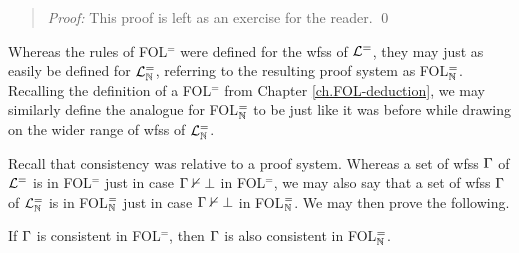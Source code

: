 \begin{quote} 
  \textit{Proof:}
  This proof is left as an exercise for the reader.
  \qed
\end{quote}


Whereas the rules of FOL$^=$ were defined for the wfss of $\mathcal{L}^{=}$, they may just as easily be defined for $\mathcal{L}^{=}_{\mathbb{N}}$, referring to the resulting proof system as FOL$^=_{\mathbb{N}}$. 
Recalling the definition of a FOL$^=$  from Chapter \ref{ch.FOL-deduction}, we may similarly define the analogue for FOL$^=_{\mathbb{N}}$ to be just like it was before while drawing on the wider range of wfss of $\mathcal{L}^{=}_{\mathbb{N}}$.


Recall that consistency was relative to a proof system.
Whereas a set of wfss $\Gamma$ of $\mathcal{L}^{=}$ is  in FOL$^=$ just in case $\Gamma \nvdash \bot$ in FOL$^=$, we may also say that a set of wfss $\Gamma$ of $\mathcal{L}^{=}_{\mathbb{N}}$ is  in FOL$^=_{\mathbb{N}}$ just in case $\Gamma \nvdash \bot$ in FOL$^=_{\mathbb{N}}$.
We may then prove the following.

\begin{Lthm} \label{lemma:const}
  If $\Gamma$ is consistent in FOL$^=$, then $\Gamma$ is also consistent in FOL$^=_{\mathbb{N}}$.
\end{Lthm}

